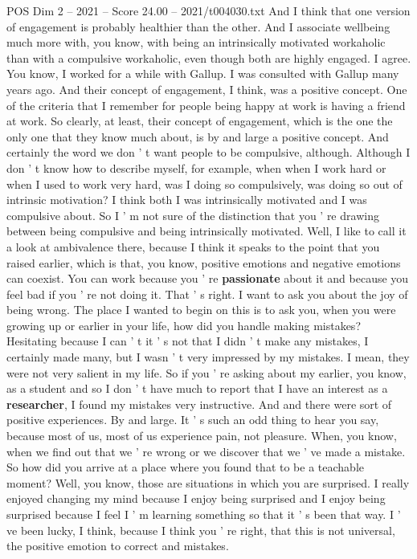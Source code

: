 \begin{textsample}{POS Dim 2 – 2021 – Score 24.00 – 2021/t004030.txt}
And I think that one version of engagement is probably healthier than the other.
And I associate wellbeing much more with, you know, with being an intrinsically motivated workaholic than with a compulsive workaholic, even though both are highly engaged.
I agree.
You know, I worked for a while with Gallup.
I was consulted with Gallup many years ago.
And their concept of engagement, I think, was a positive concept.
One of the criteria that I remember for people being happy at work is having a friend at work.
So clearly, at least, their concept of engagement, which is the one the only one that they know much about, is by and large a positive concept.
And certainly the word we don ' t want people to be compulsive, although.
Although I don ' t know how to describe myself, for example, when when I work hard or when I used to work very hard, was I doing so compulsively, was doing so out of intrinsic motivation?
I think both I was intrinsically motivated and I was compulsive about.
So I ' m not sure of the distinction that you ' re drawing between being compulsive and being intrinsically motivated.
Well, I like to call it a look at ambivalence there, because I think it speaks to the point that you raised earlier, which is that, you know, positive emotions and negative emotions can coexist.
You can work because you ' re \textbf{passionate} about it and because you feel bad if you ' re not doing it.
That ' s right.
I want to ask you about the joy of being wrong.
The place I wanted to begin on this is to ask you, when you were growing up or earlier in your life, how did you handle making mistakes?
Hesitating because I can ' t it ' s not that I didn ' t make any mistakes, I certainly made many, but I wasn ' t very impressed by my mistakes.
I mean, they were not very salient in my life.
So if you ' re asking about my earlier, you know, as a student and so I don ' t have much to report that I have an interest as a \textbf{researcher}, I found my mistakes very instructive.
And and there were sort of positive experiences.
By and large.
It ' s such an odd thing to hear you say, because most of us, most of us experience pain, not pleasure.
When, you know, when we find out that we ' re wrong or we discover that we ' ve made a mistake.
So how did you arrive at a place where you found that to be a teachable moment?
Well, you know, those are situations in which you are surprised.
I really enjoyed changing my mind because I enjoy being surprised and I enjoy being surprised because I feel I ' m learning something so that it ' s been that way.
I ' ve been lucky, I think, because I think you ' re right, that this is not universal, the positive emotion to correct and mistakes.

\end{textsample}
